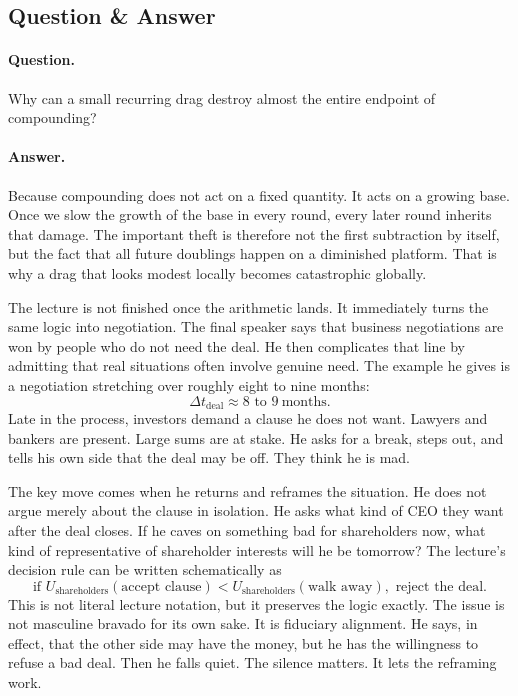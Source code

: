 \subsection{Question \& Answer}

\paragraph{Question.}
Why can a small recurring drag destroy almost the entire endpoint of compounding?

\paragraph{Answer.}
Because compounding does not act on a fixed quantity. It acts on a growing base. Once we slow the growth of the base in every round, every later round inherits that damage. The important theft is therefore not the first subtraction by itself, but the fact that all future doublings happen on a diminished platform. That is why a drag that looks modest locally becomes catastrophic globally.

The lecture is not finished once the arithmetic lands. It immediately turns the same logic into negotiation. The final speaker says that business negotiations are won by people who do not need the deal. He then complicates that line by admitting that real situations often involve genuine need. The example he gives is a negotiation stretching over roughly eight to nine months:
\begin{equation}
\Delta t_{\text{deal}}\approx 8\text{ to }9\ \text{months}.
\end{equation}
Late in the process, investors demand a clause he does not want. Lawyers and bankers are present. Large sums are at stake. He asks for a break, steps out, and tells his own side that the deal may be off. They think he is mad.

The key move comes when he returns and reframes the situation. He does not argue merely about the clause in isolation. He asks what kind of CEO they want after the deal closes. If he caves on something bad for shareholders now, what kind of representative of shareholder interests will he be tomorrow? The lecture's decision rule can be written schematically as
\begin{equation}
\text{if }U_{\text{shareholders}}(\text{accept clause})
<
U_{\text{shareholders}}(\text{walk away}),
\text{ reject the deal.}
\end{equation}
This is not literal lecture notation, but it preserves the logic exactly. The issue is not masculine bravado for its own sake. It is fiduciary alignment. He says, in effect, that the other side may have the money, but he has the willingness to refuse a bad deal. Then he falls quiet. The silence matters. It lets the reframing work.


